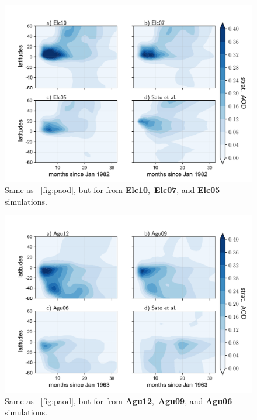 \documentclass[acpd, hvmath, online]{copernicus_discussions}
\begin{document}
\newpage
\begin{figure}[ht!]
\includegraphics[width=.8\textwidth,height=.6\textheight,trim={0.1cm 0.1cm 0.1cm 0.1cm},clip]{Elc_mean_saod.pdf}
\caption{Same as ~\ref{fig:paod}, but for from \textbf{Elc10},~\textbf{Elc07}, and \textbf{Elc05} simulations.} 
\label{fig:eaod}
\end{figure}


\newpage
\begin{figure}[ht!]
\includegraphics[width=.8\textwidth,height=.6\textheight,trim={0.1cm 0.1cm 0.1cm 0.1cm},clip]{Agu_mean_saod.pdf}
\caption{Same as ~\ref{fig:paod}, but for from \textbf{Agu12},~\textbf{Agu09}, and \textbf{Agu06} simulations.} 
\label{fig:aaod}
\end{figure}
\end{document}
